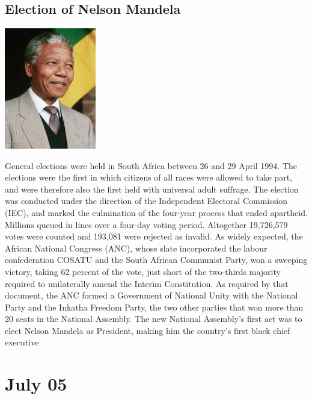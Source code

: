 \documentclass[11pt]{report}
\begin{document}
\subsection{Election of Nelson Mandela}
\vspace{2mm}\begin{center}\includegraphics[width=4cm]{./img/mandela.jpg}\end{center}
General elections were held in South Africa between 26 and 29 April 1994. The elections were the first in which citizens of all races were allowed to take part, and were therefore also the first held with universal adult suffrage. The election was conducted under the direction of the Independent Electoral Commission (IEC), and marked the culmination of the four-year process that ended apartheid.\\
\indent Millions queued in lines over a four-day voting period. Altogether 19,726,579 votes were counted and 193,081 were rejected as invalid. As widely expected, the African National Congress (ANC), whose slate incorporated the labour confederation COSATU and the South African Communist Party, won a sweeping victory, taking 62 percent of the vote, just short of the two-thirds majority required to unilaterally amend the Interim Constitution. As required by that document, the ANC formed a Government of National Unity with the National Party and the Inkatha Freedom Party, the two other parties that won more than 20 seats in the National Assembly. The new National Assembly's first act was to elect Nelson Mandela as President, making him the country's first black chief executive
\section{July 05}
\end{document}
